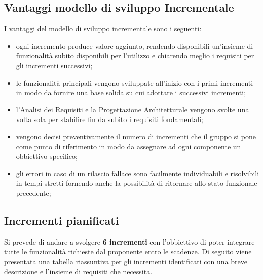 \subsection{Vantaggi modello di sviluppo Incrementale}
	I vantaggi del modello di sviluppo incrementale sono i seguenti:
	\begin{itemize}
		\item ogni incremento produce valore aggiunto, rendendo disponibili un'insieme di funzionalità subito disponibili per l'utilizzo e chiarendo meglio i requisiti per gli incrementi successivi;
		\item le funzionalità principali vengono sviluppate all'inizio con i primi incrementi in modo da fornire una base solida su cui adottare i successivi incrementi;
		\item l'Analisi dei Requisiti e la Progettazione Architetturale vengono svolte una volta sola per stabilire fin da subito i requisiti fondamentali;
		\item vengono decisi preventivamente il numero di incrementi che il gruppo si pone come punto di riferimento in modo da assegnare ad ogni componente un obbiettivo specifico;
		\item gli errori in caso di un rilascio fallace sono facilmente individuabili e risolvibili in tempi stretti fornendo anche la possibilità di ritornare allo stato funzionale precedente;
	\end{itemize}

\subsection{Incrementi pianificati}

Si prevede di andare a svolgere \textbf{6 incrementi} con l'obbiettivo di poter integrare tutte le funzionalità richieste dal proponente entro le scadenze. Di seguito viene presentata una tabella riassuntiva per gli incrementi identificati con una breve descrizione e l'insieme di requisiti che necessita.

